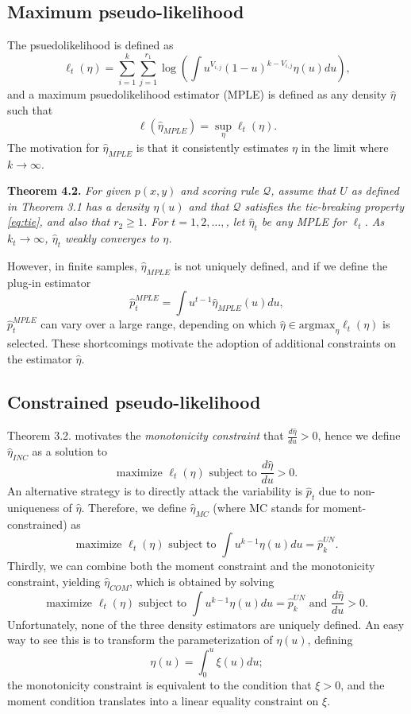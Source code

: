\documentclass{article}
\newcommand{\argmax}{\text{argmax}}
\begin{document}
\subsection{Maximum pseudo-likelihood}

The psuedolikelihood is defined as
\begin{equation}\label{eq:psuedo}
\ell_t(\eta) = \sum_{i=1}^k \sum_{j=1}^{r_1} \log\left(\int u^{V_{i, j}} (1-u)^{k - V_{i, j}} \eta(u) du\right),
\end{equation}
and a maximum psuedolikelihood estimator (MPLE) is defined as any density $\hat{\eta}$ such that
\[
\ell(\hat{\eta}_{MPLE}) = \sup_{\eta} \ell_t(\eta).
\]
The motivation for $\hat{\eta}_{MPLE}$ is that it consistently estimates $\eta$ in the limit where $k \to \infty$.

\noindent\textbf{Theorem 4.2.}
\emph{
For given $p(x, y)$ and scoring rule $\mathcal{Q}$, assume that $U$ as defined in Theorem 3.1 has a density $\eta(u)$
and that $\mathcal{Q}$ satisfies the tie-breaking property \eqref{eq:tie}, and also that $r_2 \geq 1$.
For $t = 1, 2, \hdots, $, let $\hat{\eta}_t$ be any MPLE for $\ell_t$.
As $k_t \to \infty$, $\hat{\eta}_t$ weakly converges to $\eta$.}

However, in finite samples, $\hat{\eta}_{MPLE}$ is not uniquely defined,
and if we define the plug-in estimator
\[
\hat{p}_t^{MPLE} = \int u^{t-1} \hat{\eta}_{MPLE}(u) du,
\]
$\hat{p}_t^{MPLE}$ can vary over a large range, depending on which $\hat{\eta} \in \argmax_{\eta} \ell_t(\eta)$
is selected.
These shortcomings motivate the adoption of additional constraints on the estimator $\hat{\eta}.$

\subsection{Constrained pseudo-likelihood}

Theorem 3.2. motivates the \emph{monotonicity constraint} that $\frac{d\hat{\eta}}{du} > 0$,
hence we define $\hat{\eta}_{INC}$ as a solution to
\[
\text{maximize }\ell_t(\eta) \text{ subject to }\frac{d\hat{\eta}}{du} > 0.
\]
An alternative strategy is to directly attack the variability is $\hat{p}_t$ due to non-uniqueness of $\hat{\eta}$.
Therefore, we define $\hat{\eta}_{MC}$ (where MC stands for moment-constrained)
as
\[
\text{maximize }\ell_t(\eta) \text{ subject to }\int u^{k-1} \eta(u) du = \hat{p}_k^{UN}.
\]
Thirdly, we can combine both the moment constraint and the monotonicity constraint, yielding
$\hat{\eta}_{COM}$, which is obtained by solving
\[
\text{maximize }\ell_t(\eta) \text{ subject to }\int u^{k-1} \eta(u) du = \hat{p}_k^{UN}\text{ and }\frac{d\hat{\eta}}{du} > 0.
\]
Unfortunately, none of the three density estimators are uniquely defined.
An easy way to see this is to transform the parameterization of $\eta(u)$,
defining
\[
\eta(u) = \int_0^u \xi(u) du;
\]
the monotonicity constraint is equivalent to the condition that $\xi > 0$,
and the moment condition translates into a linear equality constraint on $\xi$.
\end{document}
